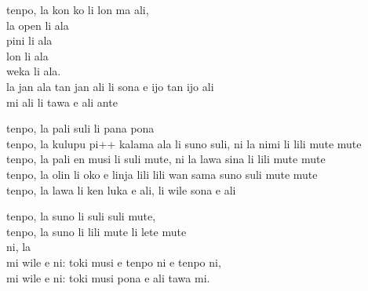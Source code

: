 \documentclass{article}
\begin{document}
    tenpo, la kon ko li lon ma ali, \\
    la open li ala \\
    pini li ala \\
    lon li ala \\
    weka li ala. \\
    la jan ala tan jan ali li sona e ijo tan ijo ali \\
    mi ali li tawa e ali ante

    tenpo, la pali suli li pana pona \\
    tenpo, la kulupu pi++ kalama ala li suno suli, ni la nimi li lili mute mute \\
    tenpo, la pali en musi li suli mute, ni la lawa sina li lili mute mute \\
    tenpo, la olin li oko e linja lili lili wan sama suno suli mute mute \\
    tenpo, la lawa li ken luka e ali, li wile sona e ali

    \bigskip

    tenpo, la suno li suli suli mute, \\
    tenpo, la suno li lili mute li lete mute \\
    ni, la \\
    mi wile e ni: toki musi e tenpo ni e tenpo ni, \\
    mi wile e ni: toki musi pona e ali tawa mi.





    \pagebreak
\end{document}
